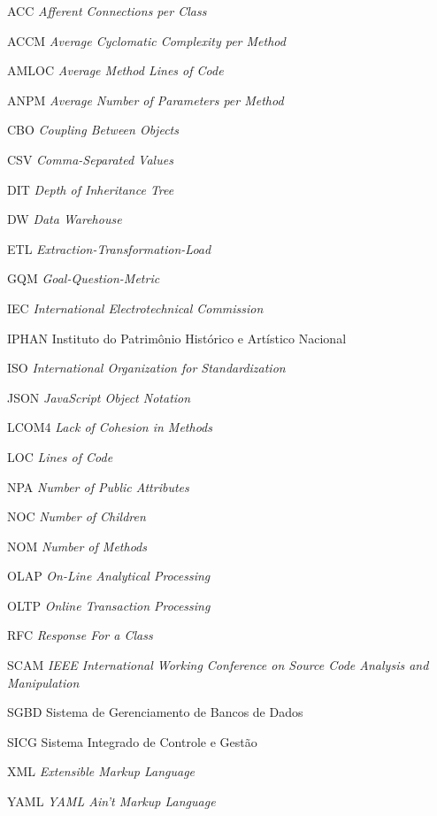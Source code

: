 \begin{siglas}
\item [ACC]   \textit{Afferent Connections per Class}
\item [ACCM]  \textit{Average Cyclomatic Complexity per Method}
\item [AMLOC] \textit{Average Method Lines of Code}
\item [ANPM]  \textit{Average Number of Parameters per Method}
\item [CBO]   \textit{Coupling Between Objects}
\item [CSV]   \textit{Comma-Separated Values}
\item [DIT]	  \textit{Depth of Inheritance Tree}
\item [DW]	  \textit{Data Warehouse}
\item [ETL]   \textit{Extraction-Transformation-Load}
\item [GQM]   \textit{Goal-Question-Metric}
\item [IEC]   \textit{International Electrotechnical Commission}
\item [IPHAN] Instituto do Patrimônio Histórico e Artístico Nacional
\item [ISO]   \textit{International Organization for Standardization}
\item [JSON]   \textit{JavaScript Object Notation}
\item [LCOM4] \textit{Lack of Cohesion in Methods}
\item [LOC]   \textit{Lines of Code}
\item [NPA]   \textit{Number of Public Attributes}
\item [NOC]   \textit{Number of Children}
\item [NOM]   \textit{Number of Methods}
\item [OLAP]  \textit{On-Line Analytical Processing}
\item [OLTP]  \textit{Online Transaction Processing}
\item [RFC]   \textit{Response For a Class}
\item [SCAM]  \textit{IEEE International Working Conference on Source Code Analysis and Manipulation}
\item [SGBD]  Sistema de Gerenciamento de Bancos de Dados
\item [SICG]  Sistema Integrado de Controle e Gestão 
\item [XML]    \textit{Extensible Markup Language}
\item [YAML]   \textit{YAML Ain't Markup Language}  
\end{siglas}
